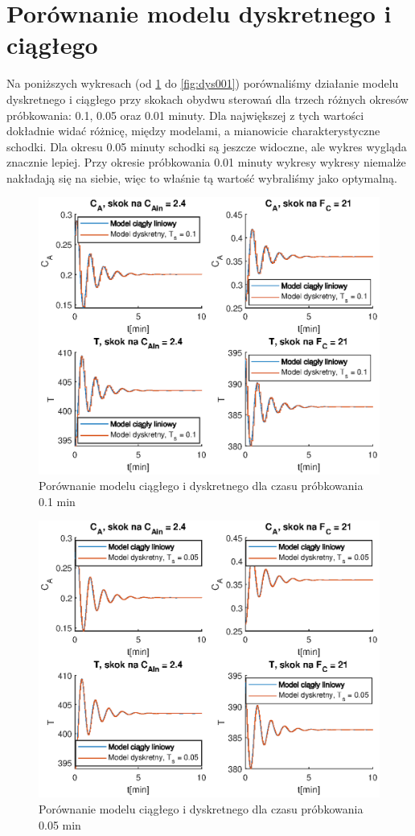 \section{Porównanie modelu dyskretnego i ciągłego}
Na poniższych wykresach (od \ref{fig:dys01} do \ref{fig:dys001}) porównaliśmy działanie modelu dyskretnego i ciągłego przy skokach obydwu sterowań dla trzech różnych okresów próbkowania: 0.1, 0.05 oraz 0.01 minuty. Dla największej z tych wartości dokładnie widać różnicę, między modelami, a mianowicie charakterystyczne schodki. Dla okresu 0.05 minuty schodki są jeszcze widoczne, ale wykres wygląda znacznie lepiej. Przy okresie próbkowania 0.01 minuty wykresy wykresy niemalże nakładają się na siebie, więc to właśnie tą wartość wybraliśmy jako optymalną.
\begin{figure}
	\centering
	\includegraphics[width=.8\linewidth]{plot/dysk_1.eps}
	\caption{Porównanie modelu ciągłego i dyskretnego dla czasu próbkowania 0.1 min}
	\label{fig:dys01}
\end{figure}
\begin{figure}
\centering
\includegraphics[width=.8\linewidth]{plot/dysk_05.eps}
\caption{Porównanie modelu ciągłego i dyskretnego dla czasu próbkowania 0.05 min}
\label{fig:dys005}
\end{figure}
